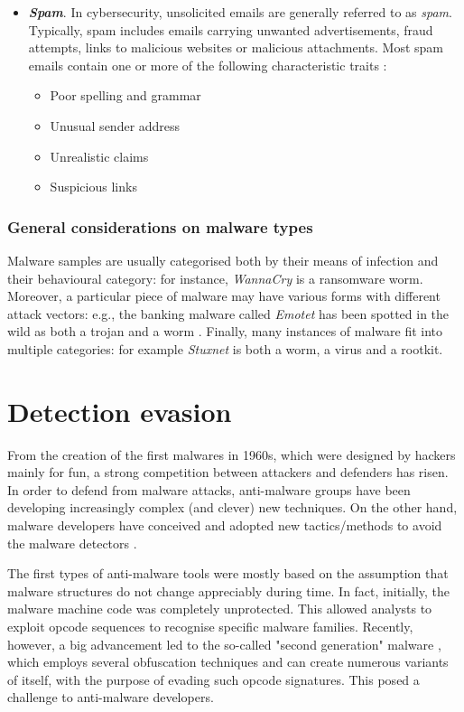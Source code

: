 \documentclass[pdfa%
,cucitura%
]{toptesi}
\begin{document}
\begin{itemize}
	\item \textbf{\textit{Spam}}. In cybersecurity, unsolicited emails are generally referred to as \textit{spam}. Typically, spam includes emails carrying unwanted advertisements, fraud attempts, links to malicious websites or malicious attachments. Most spam emails contain one or more of the following characteristic traits \cite{IngallsTOM}:
	\begin{itemize}
		\item Poor spelling and grammar
		\item Unusual sender address
		\item Unrealistic claims
		\item Suspicious links
	\end{itemize}
\end{itemize}

\subsubsection{General considerations on malware types}
Malware samples are usually categorised both by their means of infection and their behavioural category: for instance, \textit{WannaCry} is a ransomware worm. Moreover, a particular piece of malware may have various forms with different attack vectors: e.g., the banking malware called \textit{Emotet} has been spotted in the wild as both a trojan and a worm \cite{FruhlingerME}. Finally, many instances of malware fit into multiple categories: for example \textit{Stuxnet} is both a worm, a virus and a rootkit.

\section{Detection evasion}
From the creation of the first malwares in 1960s, which were designed by hackers mainly for fun, a strong competition between attackers and defenders has risen. In order to defend from malware attacks, anti-malware groups have been developing increasingly complex (and clever) new techniques. On the other hand, malware developers have conceived and adopted new tactics/methods to avoid the malware detectors \cite{Szor_P}.

The first types of anti-malware tools were mostly based on the assumption that malware structures do not change appreciably during time. In fact, initially, the malware machine code was completely unprotected. This allowed analysts to exploit opcode sequences to recognise specific malware families. Recently, however, a big advancement led to the so-called "second generation" malware \cite{Sharma_2014}, which employs several obfuscation techniques and can create numerous variants of itself, with the purpose of evading such opcode signatures. This posed a challenge to anti-malware developers.
\end{document}
